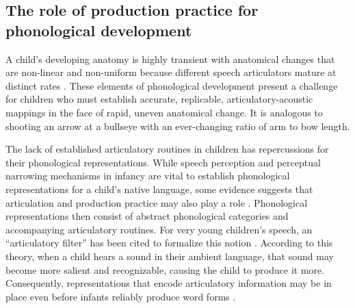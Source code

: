 \documentclass[a4paper,man,natbib,donotrepeattitle, apacite]{apa6}
\begin{document}
\subsection{The role of production practice for phonological development}

A child’s developing anatomy is highly transient with anatomical changes that are non-linear \cite{vorperianDevelopmentVocalTract2005} and non-uniform because different speech articulators mature at distinct rates \cite{nittrouerEmergenceMatureGestural1993}. These elements of phonological development present a challenge for children who must establish accurate, replicable, articulatory-acoustic mappings in the face of rapid, uneven anatomical change. It is analogous to shooting an arrow at a bullseye with an ever-changing ratio of arm to bow length. 

The lack of established articulatory routines in children has repercussions for their phonological representations. While speech perception and perceptual narrowing mechanisms in infancy are vital to establish phonological representations for a child’s native language, some evidence suggests that articulation and production practice may also play a role \cite{brudererSensorimotorInfluencesSpeech2015,keren-portnoyRoleVocalPractice2010,mcallisterbyunMotorInfluencesGrammar2016,mennChallengesTheoriesCharges2013,vihmanLearningWordsLearning2017,zamunerReverseProductionEffect2018}. Phonological representations then consist of abstract phonological categories and accompanying articulatory routines. For very young children’s speech, an ``articulatory filter'' has been cited to formalize this notion \cite{depaolisProductionPatternsInfluence2011,depaolisInfluenceBabblingPatterns2013,laingBabbleWordsInfants2020,vihmanVariablePathsEarly1993,vihmanLearningWordsLearning2017}. According to this theory, when a child hears a sound in their ambient language, that sound may become more salient and recognizable, causing the child to produce it more. Consequently, representations that encode articulatory information may be in place even before infants reliably produce word forms \cite{brudererSensorimotorInfluencesSpeech2015}. 
\end{document}
